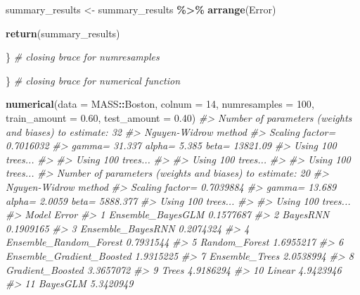 \documentclass[
]{book}
\newenvironment{Shaded}{\begin{snugshade}}{\end{snugshade}}
\newcommand{\AttributeTok}[1]{\textcolor[rgb]{0.13,0.29,0.53}{#1}}
\newcommand{\CommentTok}[1]{\textcolor[rgb]{0.56,0.35,0.01}{\textit{#1}}}
\newcommand{\DecValTok}[1]{\textcolor[rgb]{0.00,0.00,0.81}{#1}}
\newcommand{\FloatTok}[1]{\textcolor[rgb]{0.00,0.00,0.81}{#1}}
\newcommand{\FunctionTok}[1]{\textcolor[rgb]{0.13,0.29,0.53}{\textbf{#1}}}
\newcommand{\NormalTok}[1]{#1}
\newcommand{\OtherTok}[1]{\textcolor[rgb]{0.56,0.35,0.01}{#1}}
\newcommand{\SpecialCharTok}[1]{\textcolor[rgb]{0.81,0.36,0.00}{\textbf{#1}}}
\begin{document}
\begin{Shaded}
\begin{Highlighting}[]
\NormalTok{summary\_results }\OtherTok{\textless{}{-}}\NormalTok{ summary\_results }\SpecialCharTok{\%\textgreater{}\%} \FunctionTok{arrange}\NormalTok{(Error)}

\FunctionTok{return}\NormalTok{(summary\_results)}

\NormalTok{\} }\CommentTok{\# closing brace for numresamples}

\NormalTok{\} }\CommentTok{\# closing brace for numerical function}

\FunctionTok{numerical}\NormalTok{(}\AttributeTok{data =}\NormalTok{ MASS}\SpecialCharTok{::}\NormalTok{Boston, }\AttributeTok{colnum =} \DecValTok{14}\NormalTok{, }\AttributeTok{numresamples =} \DecValTok{100}\NormalTok{, }\AttributeTok{train\_amount =} \FloatTok{0.60}\NormalTok{, }\AttributeTok{test\_amount =} \FloatTok{0.40}\NormalTok{)}
\CommentTok{\#\textgreater{} Number of parameters (weights and biases) to estimate: 32 }
\CommentTok{\#\textgreater{} Nguyen{-}Widrow method}
\CommentTok{\#\textgreater{} Scaling factor= 0.7016032 }
\CommentTok{\#\textgreater{} gamma= 31.337     alpha= 5.385    beta= 13821.09}
\CommentTok{\#\textgreater{} Using 100 trees...}
\CommentTok{\#\textgreater{} }
\CommentTok{\#\textgreater{} Using 100 trees...}
\CommentTok{\#\textgreater{} }
\CommentTok{\#\textgreater{} Using 100 trees...}
\CommentTok{\#\textgreater{} }
\CommentTok{\#\textgreater{} Using 100 trees...}
\CommentTok{\#\textgreater{} Number of parameters (weights and biases) to estimate: 20 }
\CommentTok{\#\textgreater{} Nguyen{-}Widrow method}
\CommentTok{\#\textgreater{} Scaling factor= 0.7039884 }
\CommentTok{\#\textgreater{} gamma= 13.689     alpha= 2.0059   beta= 5888.377}
\CommentTok{\#\textgreater{} Using 100 trees...}
\CommentTok{\#\textgreater{} }
\CommentTok{\#\textgreater{} Using 100 trees...}
\CommentTok{\#\textgreater{}                        Model     Error}
\CommentTok{\#\textgreater{} 1          Ensemble\_BayesGLM 0.1577687}
\CommentTok{\#\textgreater{} 2                   BayesRNN 0.1909165}
\CommentTok{\#\textgreater{} 3          Ensemble\_BayesRNN 0.2074324}
\CommentTok{\#\textgreater{} 4     Ensemble\_Random\_Forest 0.7931544}
\CommentTok{\#\textgreater{} 5              Random\_Forest 1.6955217}
\CommentTok{\#\textgreater{} 6  Ensemble\_Gradient\_Boosted 1.9315225}
\CommentTok{\#\textgreater{} 7             Ensemble\_Trees 2.0538994}
\CommentTok{\#\textgreater{} 8           Gradient\_Boosted 3.3657072}
\CommentTok{\#\textgreater{} 9                      Trees 4.9186294}
\CommentTok{\#\textgreater{} 10                    Linear 4.9423946}
\CommentTok{\#\textgreater{} 11                  BayesGLM 5.3420949}
\end{Highlighting}
\end{Shaded}
\end{document}
